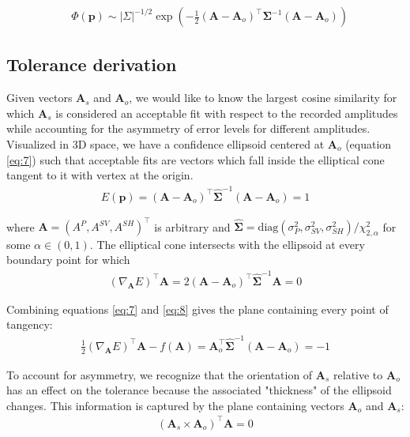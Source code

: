 \documentclass[preprint]{seismica}
\begin{document}
    \begin{align} \label{eq:6}
      &\Phi(\bm{p}) \sim |\Sigma|^{-1/2} \exp \left( - \frac{1}{2} (\bm{A} - \bm{A}_o)^\top \bm{\Sigma}^{-1} (\bm{A} - \bm{A}_o) \right)
    \end{align}

  \subsection{Tolerance derivation}
    Given vectors $\bm{A}_s$ and $\bm{A}_o$, we would like to know the largest cosine
    similarity for which $\bm{A}_s$ is considered an acceptable fit with respect to the recorded amplitudes
    while accounting for the asymmetry of error levels for different amplitudes. Visualized in 3D
    space, we have a confidence ellipsoid centered at $\bm{A}_o$ (equation \ref{eq:7}) such that
    acceptable fits are vectors which fall inside the elliptical cone tangent to it with vertex at the
    origin.
    \begin{align} \label{eq:7}
      E(\bm{p}) = (\bm{A} - \bm{A}_o)^\top \hat{\bm{\Sigma}}^{-1} (\bm{A} - \bm{A}_o)  = 1
    \end{align}
    
    \noindent where $\bm{A} = (A^P, A^{SV}, A^{SH})^\top$ is arbitrary
    and $\hat{\bm{\Sigma}} = \text{diag}(\sigma_P^2, \sigma_{SV}^2, \sigma_{SH}^2)/\chi^2_{2,\alpha}$ for some $\alpha \in (0,1)$. The elliptical
    cone intersects with the ellipsoid at every boundary point for which
    \begin{align} \label{eq:8}
      (\nabla_{\bm{A}} E)^\top \bm{A} = 2(\bm{A} - \bm{A}_o)^\top \hat{\bm{\Sigma}}^{-1} \bm{A} = 0
    \end{align}
    
    Combining equations \ref{eq:7} and \ref{eq:8} gives the plane containing every point of 
    tangency:
    \begin{align} \label{eq:9}
      \frac{1}{2} (\nabla_{\bm{A}} E)^\top \bm{A} - f(\bm{A}) = 
              \bm{A}_o^\top \hat{\bm{\Sigma}}^{-1} (\bm{A} - \bm{A}_o)  = -1
    \end{align}

    To account for asymmetry, we recognize that the orientation of $\bm{A}_s$ relative to $\bm{A}_o$
    has an effect on the tolerance because the associated "thickness" of the ellipsoid changes.
    This information is captured by the plane containing vectors $\bm{A}_o$ and $\bm{A}_s$:
    \begin{align} \label{eq:10}
      (\bm{A}_s \times \bm{A}_o)^\top \bm{A} = 0
    \end{align}
\end{document}

